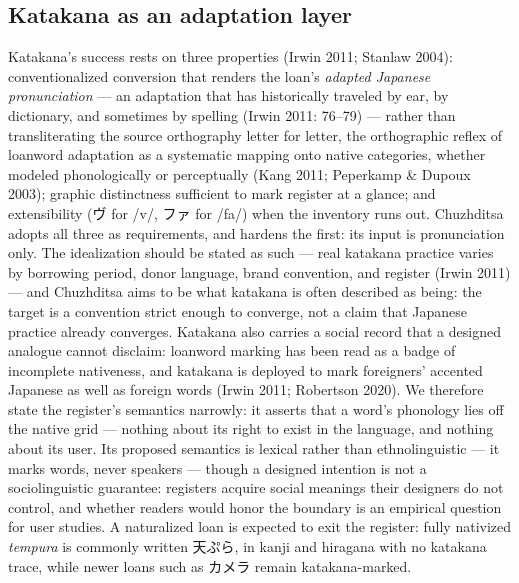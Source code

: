 \documentclass[11pt]{article}
\newcommand{\ph}[1]{{\ipafont/#1/}}
\newcommand{\src}[1]{{\ipafont #1}}
\begin{document}
\subsection{Katakana as an adaptation layer}
Katakana's success rests on three properties (Irwin 2011; Stanlaw 2004): conventionalized conversion that renders the loan's \emph{adapted Japanese pronunciation} — an adaptation that has historically traveled by ear, by dictionary, and sometimes by spelling (Irwin 2011: 76--79) — rather than transliterating the source orthography letter for letter, the orthographic reflex of loanword adaptation as a systematic mapping onto native categories, whether modeled phonologically or perceptually (Kang 2011; Peperkamp \& Dupoux 2003); graphic distinctness sufficient to mark register at a glance; and extensibility (\src{ヴ} for \ph{v}, \src{ファ} for \ph{fa}) when the inventory runs out. Chuzhditsa adopts all three as requirements, and hardens the first: its input is pronunciation only. The idealization should be stated as such — real katakana practice varies by borrowing period, donor language, brand convention, and register (Irwin 2011) — and Chuzhditsa aims to be what katakana is often described as being: the target is a convention strict enough to converge, not a claim that Japanese practice already converges. Katakana also carries a social record that a designed analogue cannot disclaim: loanword marking has been read as a badge of incomplete nativeness, and katakana is deployed to mark foreigners' accented Japanese as well as foreign words (Irwin 2011; Robertson 2020). We therefore state the register's semantics narrowly: it asserts that a word's phonology lies off the native grid — nothing about its right to exist in the language, and nothing about its user. Its proposed semantics is lexical rather than ethnolinguistic — it marks words, never speakers — though a designed intention is not a sociolinguistic guarantee: registers acquire social meanings their designers do not control, and whether readers would honor the boundary is an empirical question for user studies. A naturalized loan is expected to exit the register: fully nativized \emph{tempura} is commonly written \src{天ぷら}, in kanji and hiragana with no katakana trace, while newer loans such as \src{カメラ} remain katakana-marked.
\end{document}
